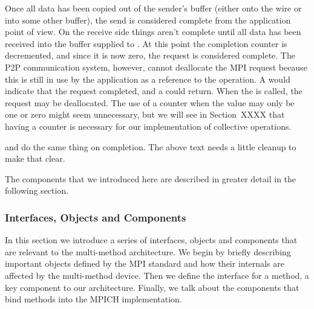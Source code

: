 Once all data has been copied out of the sender's buffer (either onto the wire
or into some other buffer), the send is considered complete from the
application point of view.  On the receive side things aren't complete until
all data has been received into the buffer supplied to .
%
At this point the completion counter is decremented, and since it is now zero,
the request is considered complete.  The P2P communication system, however,
cannot deallocate the MPI request because this is still in use by the
application as a reference to the operation.
%
A  would indicate that
the request completed, and a  could return.
%
When the  is called, the request may be deallocated.
%
The use of a counter when the value may only be one or zero might seem
unnecessary, but we will see in Section~XXXX that having a counter is
necessary for our implementation of collective operations.

\begin{cmt}
   and  do the same thing on completion.  The
  above text needs a little cleanup to make that clear.
\end{cmt}

The components that we introduced here are described in greater detail in the
following section.

\subsubsection{Interfaces, Objects and Components}

In this section we introduce a series of interfaces, objects and components
that are relevant to the multi-method architecture.  We begin by briefly
describing important objects defined by the MPI standard and how their
internals are affected by the multi-method device.  Then we define the
interface for a method, a key component to our architecture.  Finally, we talk
about the components that bind methods into the MPICH implementation.

%



